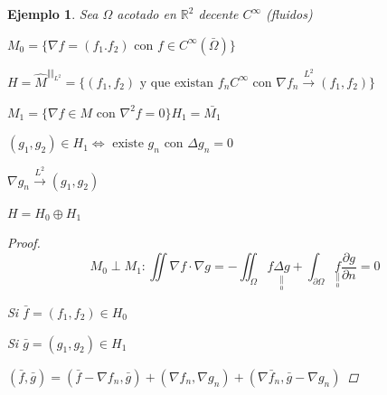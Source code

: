 \documentclass[a4paper,10pt]{book}
\newtheorem{ejemplo}{Ejemplo}
\begin{document}
\begin{ejemplo}
    Sea $ \Omega$ acotado en $\mathbb{R}^2$ decente $C^\infty$ (fluidos)  

    $M_0=\{ \nabla f= ( f_1.f_2) \text{  con  } f \in C^\infty (\bar{\Omega}) \} $

    $H = \widehat{M}^{\Vert \Vert_{L^2}} =  \{ (f_1,f_2)  \text{  y que existan  }  f_n C^\infty \text{  con  }  \nabla f_n \overset{L^2}{\rightarrow}(f_1,f_2)  \}$
    
    $M_1= \{ \nabla f \in M \text{ con } \nabla^2 f = 0  \} H_1= \bar{M_1} $

    $(g_1,g_2) \in H_1 \Leftrightarrow \text{ existe } g_n  \text{ con }  \Delta g_n = 0 $

    $ \nabla g_n \overset{L^2}{\rightarrow} (g_1,g_2) $

    $ H = H_0 \oplus  H_1$

    \begin{proof}
        \[ M_0 \perp M_1 : \iint \nabla f \cdot \nabla g = - \iint_\Omega  f \underset{  \underset{0}{\parallel}  }{\Delta g}  + \int_{\partial \Omega} \underset{  \underset{0}{\parallel}  }{f} \frac{\partial g}{ \partial n} = 0\]

        Si $\bar{f} = (f_1,f_2) \in H_0 $
    
        Si $\bar{g} = (g_1,g_2) \in H_1 $

        $(\bar{f},\bar{g}) = ( \bar{f} - \nabla f_n ,\bar{g} ) + \overset{}{( \nabla f_n, \nabla g_n )} + (\nabla \bar{f}_n, \bar{g} - \nabla g_n  )$ 
        
        
    
    \end{proof}


    
\end{ejemplo}

 
\end{document}
